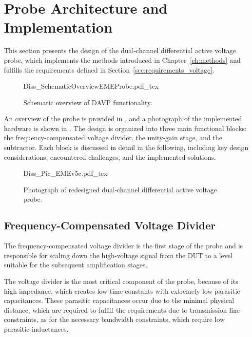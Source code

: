 
\section{Probe Architecture and Implementation}
\label{sec:design_voltage}
This section presents the design of the dual-channel differential active voltage probe, which implements the methods introduced in Chapter~\ref{ch:methods} and fulfills the requirements defined in Section~\ref{sec:requirements_voltage}.

\begin{figure}[ht]
	\centering
	{Diss_SchematicOverviewEMEProbe.pdf_tex}
	\caption{Schematic overview of DAVP functionality.}\label{fig:OverviewEMEProbe}
\end{figure}


An overview of the probe is provided in , and a photograph of the implemented hardware is shown in .
The design is organized into three main functional blocks: the frequency-compensated voltage divider, the unity-gain stage, and the subtractor.
Each block is discussed in detail in the following, including key design considerations, encountered challenges, and the implemented solutions.

\begin{figure}[ht]
	\centering
	{Diss_Pic_EMEv5c.pdf_tex}
	\caption{Photograph of redesigned dual-channel differential active voltage probe.}\label{fig:Pic_EMEProbe}
\end{figure}

\subsection{Frequency-Compensated Voltage Divider}
The frequency-compensated voltage divider is the first stage of the probe and is responsible for scaling down the high-voltage signal from the DUT to a level suitable for the subsequent amplification stages.

The voltage divider is the most critical component of the probe, because of its high impedance, which creates low time constants with extremely low parasitic capacitances.
These parasitic capacitances occur due to the minimal physical distance, which are required to fulfill the requirements due to transmission line constraints, as for the necessary bandwidth constraints, which require low parasitic inductances.

